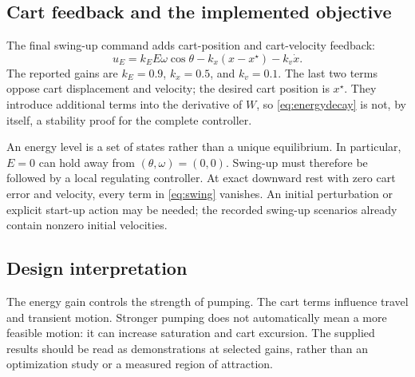 \documentclass[11pt,a4paper]{article}
\newcommand{\topic}[1]{\subsection*{\color{teal}#1}}
\newcommand{\qref}{x^{\star}}
\begin{document}
\topic{Cart feedback and the implemented objective}
The final swing-up command adds cart-position and cart-velocity feedback:
\begin{equation}\label{eq:swing}
 u_E=k_E E\omega\cos\theta-k_x(x-\qref)-k_v\dot x.
\end{equation}
The reported gains are $k_E=0.9$, $k_x=0.5$, and $k_v=0.1$. The last two terms oppose cart displacement and velocity; the desired cart position is $\qref$. They introduce additional terms into the derivative of $W$, so \eqref{eq:energydecay} is not, by itself, a stability proof for the complete controller.

An energy level is a set of states rather than a unique equilibrium. In particular, $E=0$ can hold away from $(\theta,\omega)=(0,0)$. Swing-up must therefore be followed by a local regulating controller. At exact downward rest with zero cart error and velocity, every term in \eqref{eq:swing} vanishes. An initial perturbation or explicit start-up action may be needed; the recorded swing-up scenarios already contain nonzero initial velocities.

\topic{Design interpretation}
The energy gain controls the strength of pumping. The cart terms influence travel and transient motion. Stronger pumping does not automatically mean a more feasible motion: it can increase saturation and cart excursion. The supplied results should be read as demonstrations at selected gains, rather than an optimization study or a measured region of attraction.
\end{document}
